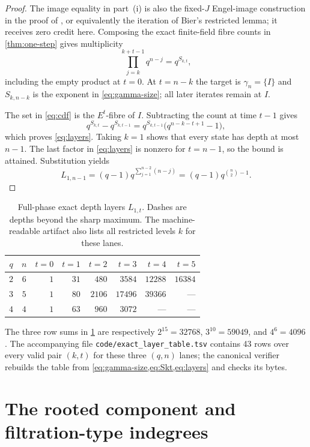 \documentclass[10pt,a4paper]{amsart}
\theoremstyle{definition}
\theoremstyle{remark}
\begin{document}
\begin{proof}
The image equality in part~(i) is also the fixed-$J$ Engel-image construction
in the proof of \citet[Theorem~1]{Bier2013}, or equivalently the iteration of Bier's
restricted lemma; it receives zero credit here.  Composing the exact
finite-field fibre counts in \cref{thm:one-step} gives multiplicity
\[
 \prod_{j=k}^{k+t-1}q^{n-j}=q^{S_{k,t}},
\]
including the empty product at $t=0$.  At $t=n-k$ the target is
$\gamma_n=\{I\}$ and $S_{k,n-k}$ is the exponent in
\cref{eq:gamma-size}; all later iterates remain at $I$.

The set in \eqref{eq:cdf} is the $E^t$-fibre of $I$.  Subtracting the
count at time $t-1$ gives
\[
 q^{S_{k,t}}-q^{S_{k,t-1}}
 =q^{S_{k,t-1}}\bigl(q^{n-k-t+1}-1\bigr),
\]
which proves \eqref{eq:layers}.  Taking $k=1$ shows that every state has
depth at most $n-1$.  The last factor in \eqref{eq:layers} is nonzero for
$t=n-1$, so the bound is attained.  Substitution yields
\[
 L_{1,n-1}=(q-1)q^{\sum_{j=1}^{n-2}(n-j)}
           =(q-1)q^{\binom n2-1}.
\]
\end{proof}

\begin{table}[H]
\centering
\small
\setlength{\tabcolsep}{4.5pt}
\caption{Full-phase exact depth layers $L_{1,t}$.  Dashes are depths beyond
the sharp maximum.  The machine-readable artifact also lists all restricted
levels $k$ for these lanes.}
\label{tab:layers}
\begin{tabular}{@{}ccrrrrrr@{}}
\toprule
$q$ & $n$ & $t=0$ & $t=1$ & $t=2$ & $t=3$ & $t=4$ & $t=5$\\
\midrule
$2$ & $6$ & $1$ & $31$ & $480$ & $3584$ & $12288$ & $16384$\\
$3$ & $5$ & $1$ & $80$ & $2106$ & $17496$ & $39366$ & ---\\
$4$ & $4$ & $1$ & $63$ & $960$ & $3072$ & --- & ---\\
\bottomrule
\end{tabular}
\end{table}

The three row sums in \cref{tab:layers} are respectively
$2^{15}=32768$, $3^{10}=59049$, and $4^6=4096$.  The accompanying file
\texttt{code/exact\_layer\_table.tsv} contains 43 rows over every valid
pair $(k,t)$ for these three $(q,n)$ lanes; the canonical verifier rebuilds
the table from \cref{eq:gamma-size,eq:Skt,eq:layers} and checks its bytes.

\section{The rooted component and filtration-type indegrees}
\label{sec:tree}
\end{document}
